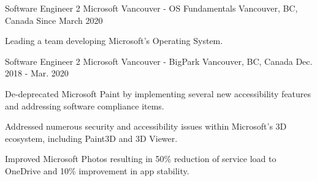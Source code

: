 

\begin{cventries}

  \cventry
    {Software Engineer 2} %
    {Microsoft Vancouver - OS Fundamentals} %
    {Vancouver, BC, Canada} %
    {Since March 2020} %
    {
      \begin{cvitems} %
	      \item {Leading a team developing Microsoft's Operating System.}
        \\
      \end{cvitems}
    }


  \cventry
    {Software Engineer 2} %
    {Microsoft Vancouver - BigPark} %
    {Vancouver, BC, Canada} %
    {Dec. 2018 - Mar. 2020} %
    {
      \begin{cvitems} %
	      \item {De-deprecated Microsoft Paint by implementing several new accessibility features and addressing software compliance items.}
	      \item {Addressed numerous security and accessibility issues within Microsoft's 3D ecosystem, including Paint3D and 3D Viewer.}
	      \item {Improved Microsoft Photos resulting in 50\% reduction of service load to OneDrive and 10\% improvement in app stability.}
        \\
      \end{cvitems}
    }


\end{cventries}
